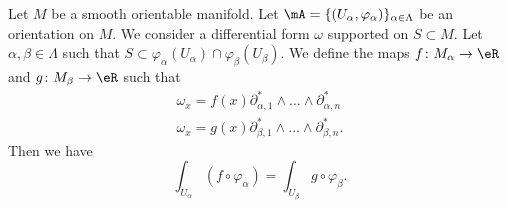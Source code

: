 \begin{proposition}	\label{PROPooGVQDooNwnGXs}
	Let \( M\) be a smooth orientable manifold. Let \( \mA= \{ (U_{\alpha},\varphi_{\alpha}) \}_{\alpha\in \Lambda}\) be an orientation on \( M\). We consider a differential form \( \omega\) supported on \( S\subset M\). Let \( \alpha,\beta\in\Lambda\) such that \( S\subset\varphi_{\alpha}(U_{\alpha})\cap\varphi_{\beta}(U_{\beta})\). We define the maps \(f \colon M_{\alpha}\to \eR  \) and \(g \colon M_{\beta}\to \eR  \) such that
	\begin{subequations}
		\begin{align}
			\omega_x=f(x)\partial_{\alpha,1}^*\wedge\ldots\wedge\partial_{\alpha,n}^* \\
			\omega_x=g(x)\partial_{\beta,1}^*\wedge\ldots\wedge\partial_{\beta,n}^*.
		\end{align}
	\end{subequations}
	Then we have
	\begin{equation}
		\int_{U_{\alpha}}(f\circ \varphi_{\alpha})=\int_{U_{\beta}}g\circ\varphi_{\beta}.
	\end{equation}
\end{proposition}

